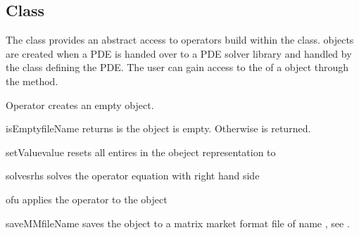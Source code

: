 \subsection{\Operator Class}
The \Operator class provides an abstract access to operators build
within the \LinearPDE class. \Operator objects are created 
when a PDE is handed over to a PDE solver library and handled
by the \LinearPDE class defining the PDE. The user can gain access
to the \Operator of a \LinearPDE object through the 
method.

\begin{classdesc}{Operator}{}
creates an empty \Operator object.
\end{classdesc}

\begin{methoddesc}[Operator]{isEmpty}{fileName}
returns \True is the object is empty. Otherwise \True is returned.
\end{methoddesc}

\begin{methoddesc}[Operator]{setValue}{value}
resets all entires in the obeject representation to 
\end{methoddesc}

\begin{methoddesc}[Operator]{solves}{rhs}
solves the operator equation with right hand side 
\end{methoddesc}

\begin{methoddesc}[Operator]{of}{u}
applies the operator to the \Data object 
\end{methoddesc}

\begin{methoddesc}[Operator]{saveMM}{fileName}
saves the object to a matrix market format file of name
, see
.
\end{methoddesc}

